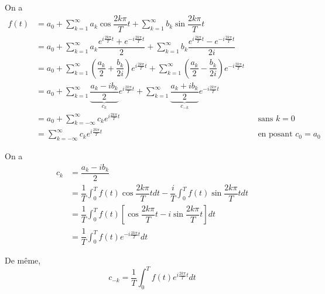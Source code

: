 \documentclass{report}
\newcommand*{\dsum}[4]{\displaystyle\sum_{#1=#2}^{#3}#4}
\newcommand*{\dint}[3]{\displaystyle\int_{#1}^{#2}#3}
\theoremstyle{definition}
\theoremstyle{remark}
\begin{document}
	On a
	\begin{align*}
		f(t)&= a_0 + \dsum{k}{1}{\infty}{a_k \cos\dfrac{2k\pi}{T}t} + \dsum{k}{1}{\infty}{b_k \sin\dfrac{2k\pi}{T}t}\\
		&= a_0 + \dsum{k}{1}{\infty}{a_k \dfrac{e^{i\frac{2k\pi}{T}t}+e^{-i\frac{2k\pi}{T}t}}{2}} + \dsum{k}{1}{\infty}{b_k \dfrac{e^{i\frac{2k\pi}{T}t}-e^{-i\frac{2k\pi}{T}t}}{2i}}\\
		&= a_0 + \dsum{k}{1}{\infty}{\left( \dfrac{a_k}{2}+\dfrac{b_k}{2i} \right) e^{i\frac{2k\pi}{T}t}} + \dsum{k}{1}{\infty}{\left( \dfrac{a_k}{2}-\dfrac{b_k}{2i} \right) e^{-i\frac{2k\pi}{T}t}}\\
		&= a_0 + \dsum{k}{1}{\infty}{\underbrace{\dfrac{a_k-ib_k}{2}}_{c_k} e^{i\frac{2k\pi}{T}t}} + \dsum{k}{1}{\infty}{\underbrace{\dfrac{a_k+ib_k}{2}}_{c_{-k}} e^{-i\frac{2k\pi}{T}t}}\\
		&= a_0 + \dsum{k}{-\infty}{\infty}{c_k e^{i\frac{2k\pi}{T}t}}&&\text{sans $k=0$}\\
		&= \dsum{k}{-\infty}{\infty}{c_k e^{i\frac{2k\pi}{T}t}}&&\text{en posant $c_0=a_0$}
	\end{align*}

	On a
	\begin{align*}
		c_k&= \dfrac{a_k-ib_k}{2}\\
		&= \dfrac{1}{T} \dint{0}{T}{f(t) \cos\dfrac{2k\pi}{T}t dt} - \dfrac{i}{T} \dint{0}{T}{f(t) \sin\dfrac{2k\pi}{T}t dt}\\
		&= \dfrac{1}{T} \dint{0}{T}{f(t) \left[ \cos\dfrac{2k\pi}{T}t - i\sin\dfrac{2k\pi}{T}t \right] dt}\\
		&= \dfrac{1}{T} \dint{0}{T}{f(t) e^{-i\frac{2k\pi}{T}t} dt}
	\end{align*}

	De m\^eme,
	\begin{equation*}
		c_{-k} = \dfrac{1}{T} \dint{0}{T}{f(t) e^{i\frac{2k\pi}{T}t} dt}
	\end{equation*}
\end{document}
